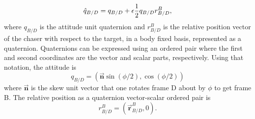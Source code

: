 \documentclass[letterpaper, preprint, paper,11pt]{AAS}	%
\begin{document}
\begin{equation}
\begin{aligned}
\label{eq:dual_quat_eg}
\hat{q}_{B/D} = q_{B/D} + \epsilon \frac{1}{2} q_{B/D} r^B_{B/D},
\end{aligned}\\
\end{equation}
where $q_{B/D}$ is the attitude unit quaternion and $r^B_{B/D}$ is the relative position vector of the chaser with respect to the target, in a body fixed basis, represented as a quaternion. Quaternions can be expressed using an ordered pair where the first and second coordinates are the vector and scalar parts, respectively. Using that notation, the attitude is
\begin{equation}
\label{eq:att_quat}
q_{B/D} = (\vec{\mathbf{n}}\sin{(\phi/2)} , \cos{(\phi/2)}) 
\end{equation}
where $\vec{\mathbf{n}}$ is the skew unit vector that one rotates frame D about by $\phi$ to get frame B. The relative position as a quaternion vector-scalar ordered pair is 
\begin{equation}
\label{eq:pos_quat}
r_{B/D}^B = (\vec{\mathbf{r}}_{B/D}^B, 0).
\end{equation}
\end{document}
